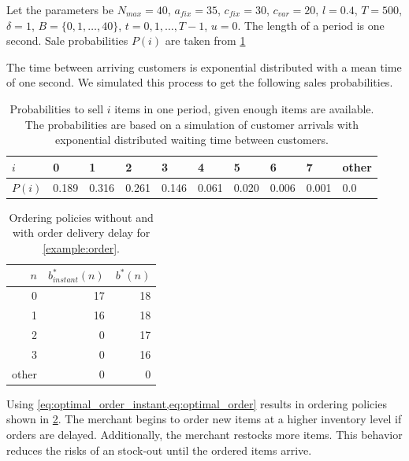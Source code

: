 \begin{example}
	\label{example:order}
	Let the parameters be $N_{max} = 40$, $a_{fix} = 35$, $c_{fix} = 30$, $c_{var} = 20$,
	$l = 0.4$, $T = 500$, $\delta = 1$, $B = \{0, 1, \ldots, 40\}$, $t = 0, 1, \ldots, T-1$, $u=0$. The length of a period is one second. Sale probabilities $P(i)$ are taken from \cref{tab:sale_probs}
\end{example}

The time between arriving customers is exponential distributed with a mean time of one second.
We simulated this process to get the following sales probabilities.

\begin{table}
\centering
\begin{tabular}{llllllllll}
	\toprule
	$i$ & 0 & 1 & 2 & 3 & 4 & 5 & 6 & 7 & other \\
	\midrule
	$P(i)$ & 0.189 & 0.316 & 0.261 & 0.146 & 0.061 & 0.020 & 0.006 & 0.001 & 0.0\\
	\bottomrule
\end{tabular}
\caption[Sale Probabilities for \cref{example:order}]{Probabilities to sell $i$ items in one period, given enough items are available. The probabilities are based on a simulation of customer arrivals with exponential distributed waiting time between customers.}
\label{tab:sale_probs}
\end{table}

\begin{table}[t]
	\centering
	\begin{tabular}{rrr}
		\toprule
		$n$ & $b^*_{instant}(n)$ & $b^*(n)$ \\
		\midrule
		0 & 17 & 18 \\
		1 & 16 & 18 \\
		2 & 0 & 17 \\
		3 & 0 & 16\\
		other & 0 & 0 \\
		\bottomrule
	\end{tabular}
\caption[Numeric Example: Ordering Policies]{Ordering policies without and with order delivery delay for \cref{example:order}.}
\label{tab:order_results}
\end{table}

Using \cref{eq:optimal_order_instant,eq:optimal_order} results in ordering policies shown in \cref{tab:order_results}.
The merchant begins to order new items at a higher inventory level if orders are delayed.
Additionally, the merchant restocks more items.
This behavior reduces the risks of an stock-out until the ordered items arrive.


